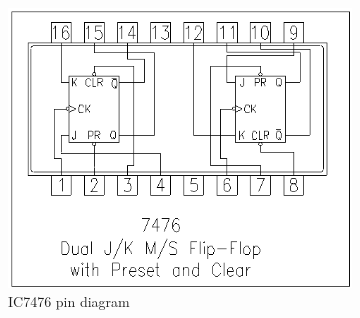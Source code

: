 \documentclass[a4paper,12pt]{article}
\begin{document}
\begin{figure}[H]
    \centering
    \begin{subfigure}[b]{0.45\textwidth}
        \centering
        \includegraphics[width=\linewidth]{figs/IC7476.png} %
	    \caption{IC7476 pin diagram}
        \label{fig:image1}
    \end{subfigure}
    \hfill %
    \begin{subfigure}[b]{0.45\textwidth}
        \centering

\end{subfigure}
\end{figure}
\end{document}
